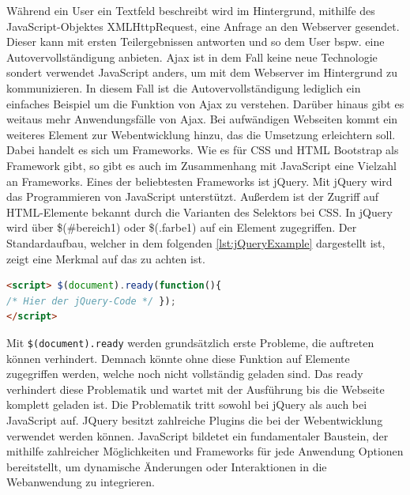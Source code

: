 \documentclass[a4paper,titlepage,halfparskip,12pt]{scrreprt}
\begin{document}
\begin{onehalfspacing}
Während ein User ein Textfeld beschreibt wird im Hintergrund, mithilfe des JavaScript-Objektes XMLHttpRequest, eine Anfrage an den Webserver gesendet. Dieser kann mit ersten Teilergebnissen antworten und so dem User bspw. eine Autovervollständigung anbieten. \ac{Ajax} ist in dem Fall keine neue Technologie sondert verwendet JavaScript anders, um mit dem Webserver im Hintergrund zu kommunizieren. In diesem Fall ist die Autovervollständigung lediglich ein einfaches Beispiel um die Funktion von \ac{Ajax} zu verstehen. Darüber hinaus gibt es weitaus mehr Anwendungsfälle von \ac{Ajax}. Bei aufwändigen Webseiten kommt ein weiteres Element zur Webentwicklung hinzu, das die Umsetzung erleichtern soll. Dabei handelt es sich um Frameworks. Wie es für \ac{CSS} und \ac{HTML} Bootstrap als Framework gibt, so gibt es auch im Zusammenhang mit JavaScript eine Vielzahl an Frameworks. Eines der beliebtesten Frameworks ist jQuery. Mit jQuery wird das Programmieren von JavaScript unterstützt. Außerdem ist der Zugriff auf HTML-Elemente bekannt durch die Varianten des Selektors bei \ac{CSS}. In jQuery wird über \$(\dq \#bereich1\dq) oder \$(\dq .farbe1\dq) auf ein Element zugegriffen. Der Standardaufbau, welcher in dem folgenden \autoref{lst:jQueryExample} dargestellt ist, zeigt eine Merkmal auf das zu achten ist.
\begin{lstlisting}[language=HTML,caption=Example Listing of jQuery,label={lst:jQueryExample}]
<script> $(document).ready(function(){
/* Hier der jQuery-Code */ });
</script>
\end{lstlisting}
Mit \texttt{\$(document).ready} werden grundsätzlich erste Probleme, die auftreten können verhindert. Demnach könnte ohne diese Funktion auf Elemente zugegriffen werden, welche noch nicht vollständig geladen sind. Das ready verhindert diese Problematik und wartet mit der Ausführung bis die Webseite komplett geladen ist. Die Problematik tritt sowohl bei jQuery als auch bei JavaScript auf. JQuery besitzt zahlreiche Plugins die bei der Webentwicklung verwendet werden können. JavaScript bildetet ein fundamentaler Baustein, der mithilfe zahlreicher Möglichkeiten und Frameworks für jede Anwendung Optionen bereitstellt, um dynamische Änderungen oder Interaktionen in die Webanwendung zu integrieren.\cite{buhler2018webtechnologien}
\pagebreak


\end{onehalfspacing}
\end{document}
